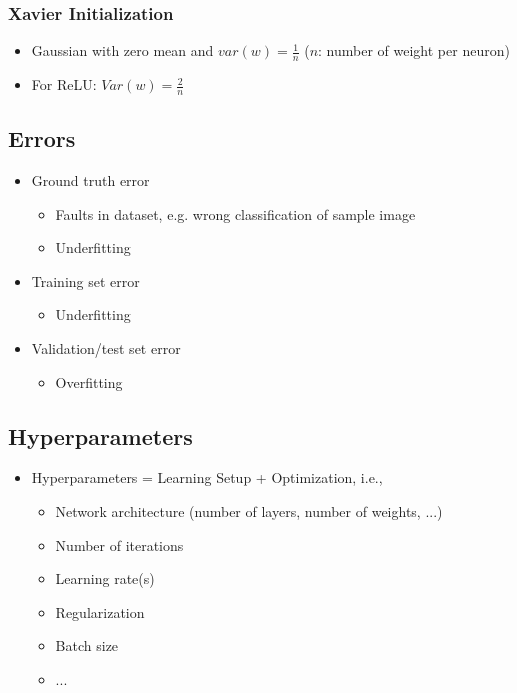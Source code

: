 \documentclass[10pt,a4paper]{article}
\begin{document}
\subsubsection{Xavier Initialization}
\begin{itemize}
	\item Gaussian with zero mean and $var(w) = \frac 1 n$ ($n$: number of weight per neuron)
	\item For ReLU: $Var(w) = \frac 2 n$
\end{itemize}

\subsection{Errors}
\begin{itemize}
	\item Ground truth error
	\begin{itemize}
		\item Faults in dataset, e.g. wrong classification of sample image
		\item Underfitting
	\end{itemize}
	\item Training set error
	\begin{itemize}
		\item Underfitting
	\end{itemize}
	\item Validation/test set error
	\begin{itemize}
		\item Overfitting
	\end{itemize}
\end{itemize}

\subsection{Hyperparameters}
\begin{itemize}
	\item Hyperparameters = Learning Setup + Optimization, i.e.,
	\begin{itemize}
		\item Network architecture (number of layers, number of weights, ...)
		\item Number of iterations
		\item Learning rate(s)
		\item Regularization
		\item Batch size
		\item ...
	\end{itemize}
\end{itemize}
\end{document}
